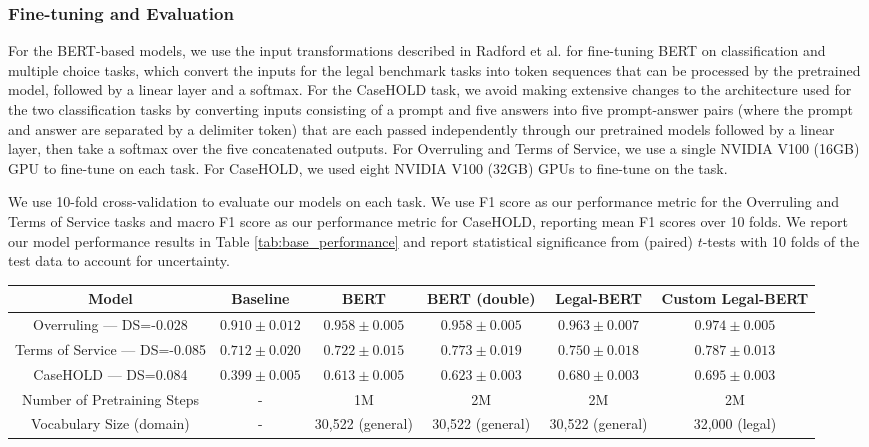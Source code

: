 \documentclass[sigconf]{acmart}
\begin{document}
\subsubsection{Fine-tuning and Evaluation}
For the BERT-based models, we use the input transformations described in Radford et al. \cite{radford2018improving} for fine-tuning BERT on classification and multiple choice tasks, which convert the inputs for the legal benchmark tasks into token sequences that can be processed by the pretrained model, followed by a linear layer and a softmax. For the CaseHOLD task, we avoid making extensive changes to the architecture used for the two classification tasks by converting inputs consisting of a prompt and five answers into five prompt-answer pairs (where the prompt and answer are separated by a delimiter token) that are each passed independently through our pretrained models followed by a linear layer, then take a softmax over the five concatenated outputs. For Overruling and Terms of Service, we use a single NVIDIA V100 (16GB) GPU to fine-tune on each task. For CaseHOLD, we used eight NVIDIA V100 (32GB) GPUs to fine-tune on the task.

We use 10-fold cross-validation to evaluate our models on each task. We use F1 score as our performance metric for the Overruling and Terms of Service tasks and macro F1 score as our performance metric for CaseHOLD, reporting mean F1 scores over 10 folds. We report our model performance results in Table \ref{tab:base_performance} and report statistical significance from (paired) $t$-tests with 10 folds of the test data to account for uncertainty.

\begin{table*}[ht!]
    \centering
    \caption{Test performance, with $\pm 1.96 \times \text{standard error}$, aggregated across 10 folds. Mean F1 scores are reported for Overruling and Terms of Service. Mean macro F1 scores are reported for CaseHOLD. The best scores are in bold.}
    \begin{tabular}{cccccc}
        \toprule
        Model & Baseline & BERT & BERT (double) & Legal-BERT & Custom Legal-BERT \\
        \midrule
        Overruling --- \textcolor{ACMDarkBlue}{DS=-0.028} & $0.910 \pm 0.012$ & $0.958 \pm 0.005$ & $0.958 \pm 0.005$ & $0.963 \pm 0.007$ & $\bm{0.974} \pm 0.005$ \\
        Terms of Service --- \textcolor{ACMDarkBlue}{DS=-0.085} & $0.712 \pm 0.020$ & $0.722 \pm 0.015$ & $0.773 \pm 0.019$ & $0.750 \pm 0.018$ & $\bm{0.787} \pm 0.013$ \\
        CaseHOLD --- \textcolor{ACMDarkBlue}{DS=0.084} & $0.399 \pm 0.005$ & $0.613 \pm 0.005$ & $0.623 \pm 0.003$ & $0.680 \pm 0.003$ & $\bm{0.695} \pm 0.003$ \\
        \midrule
        Number of Pretraining Steps & - & 1M & 2M & 2M & 2M \\
        \midrule
        Vocabulary Size (domain) & - & 30,522 (general) & 30,522 (general) & 30,522 (general) & 32,000 (legal) \\
        \bottomrule
    \end{tabular}
    \label{tab:base_performance}
\end{table*}
\end{document}
